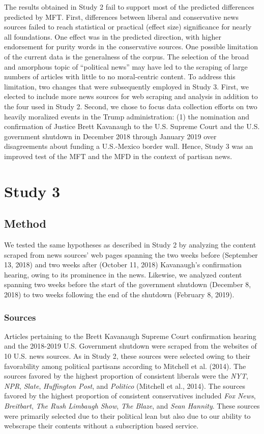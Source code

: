 \documentclass[
  man,floatsintext]{apa6}
\begin{document}
The results obtained in Study 2 fail to support most of the predicted differences
predicted by MFT. First, differences between liberal and conservative
news sources failed to reach statistical or practical (effect size)
significance for nearly all foundations. One effect was in the predicted direction, with higher endorsement for purity words in the conservative sources. One possible limitation of the current data is the generalness
of the corpus. The selection of the broad and amorphous topic of
``political news'' may have led to the scraping of large numbers of
articles with little to no moral-centric content. To address this
limitation, two changes that were subsequently employed in Study 3.
First, we elected to include more news sources for web scraping and
analysis in addition to the four used in Study 2. Second, we chose to
focus data collection efforts on two heavily moralized events in the
Trump administration: (1) the nomination and confirmation of Justice
Brett Kavanaugh to the U.S. Supreme Court and the U.S. government
shutdown in December 2018 through January 2019 over disagreements about
funding a U.S.-Mexico border wall. Hence, Study 3 was an improved test of
the MFT and the MFD in the context of partisan news.

\section{Study 3}\label{study-3}

\subsection{Method}\label{method-2}

We tested the same hypotheses as described in Study 2 by analyzing the content scraped from news sources' web pages spanning the two weeks before (September 13, 2018) and two weeks after (October 11, 2018) Kavanaugh's confirmation hearing, owing to its prominence in the news. Likewise, we analyzed content
spanning two weeks before the start of the government shutdown (December
8, 2018) to two weeks following the end of the shutdown (February 8,
2019).

\subsubsection{Sources}\label{sources-1}

Articles pertaining to the Brett Kavanaugh Supreme Court confirmation
hearing and the 2018-2019 U.S. Government shutdown were scraped from the
websites of 10 U.S. news sources. As in Study 2, these sources were
selected owing to their favorability among political partisans according
to Mitchell et al. (2014). The sources favored by the highest proportion of
consistent liberals were the \emph{NYT}, \emph{NPR}, \emph{Slate}, \emph{Huffington Post},
and \emph{Politico} (Mitchell et al., 2014). The sources favored by the highest
proportion of consistent conservatives included \emph{Fox News}, \emph{Breitbart},
\emph{The Rush Limbaugh Show}, \emph{The Blaze}, and \emph{Sean Hannity}. These sources
were primarily selected due to their political lean but also due to our
ability to webscrape their contents without a subscription based
service.
\end{document}
